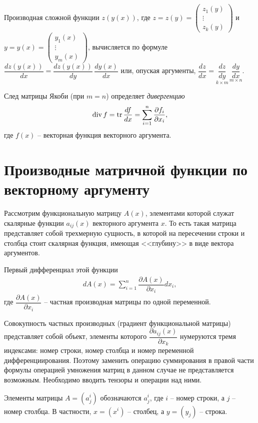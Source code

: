 \documentclass[%
	11pt,
	a4paper,
	utf8,
		]{article}
\begin{document}
Производная сложной функции $ z(y(x)) $, где $
z = z(y) = 
\begin{pmatrix}
	z_1(y) \\
	\vdots \\
	z_k(y)
\end{pmatrix}
$ и $
y = y(x) = 
\begin{pmatrix}
	y_1(x) \\
	\vdots \\
	y_m(x)
\end{pmatrix}
$, вычисляется по формуле $ \dfrac{dz(y(x))}{dx} = \dfrac{dz(y(x))}{dy} \, \dfrac{dy(x)}{dx} $ или, опуская аргументы, $ \dfrac{dz}{dx} = \underset{k \times m}{\dfrac{dz}{dy}} \, \underset{m \times n}{\dfrac{dy}{dx}} $.

След матрицы Якоби (при $ m = n $) определяет \emph{дивергенцию}
\begin{align*}
	\operatorname*{div} f = \operatorname*{tr} \dfrac{df}{dx} = \sum_{i=1}^n \dfrac{\partial f_i}{\partial x_i},
\end{align*}
где $ f(x) $ -- векторная функция векторного аргумента.

\section{Производные матричной функции по векторному аргументу}

Рассмотрим функциональную матрицу $ A(x) $, элементами которой служат скалярные функции $ a_{ij}(x) $ векторного аргумента $ x $. То есть такая матрица представляет собой трехмерную сущность, в которой на пересечении строки и столбца стоит скалярная функция, имеющая <<глубину>> в виде вектора аргументов.

Первый дифференциал этой функции
\begin{align*}
	d A(x) = \sum_{i=1}^n \dfrac{\partial A(x)}{\partial x_i} dx_i,
\end{align*}
где $ \dfrac{\partial A(x)}{\partial x_i} $ -- частная производная матрицы по одной переменной.

Совокупность частных производных (градиент функциональной матрицы) представляет собой объект, элементы которого $ \dfrac{\partial a_{ij}(x)}{\partial x_k} $ нумеруются тремя индексами: номер строки, номер столбца и номер переменной дифференциирования. Поэтому заменить операцию суммирования в правой части формулы операцией умножения матриц в данном случае не представляется возможным. Необходимо вводить тензоры и операции над ними.

Элементы матрицы $ A = (a_j^i) $ обозначаются $ a_j^i $, где $ i $ -- номер строки, а $ j $ -- номер столбца. В частности, $ x = (x^i) $ -- столбец, а $ y = (y_j) $ -- строка.
\end{document}
